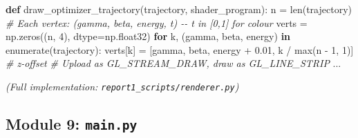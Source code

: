 \documentclass[
  11pt,
]{report}
\newenvironment{Shaded}{}{}
\newcommand{\BuiltInTok}[1]{\textcolor[rgb]{0.00,0.50,0.00}{#1}}
\newcommand{\CommentTok}[1]{\textcolor[rgb]{0.38,0.63,0.69}{\textit{#1}}}
\newcommand{\ControlFlowTok}[1]{\textcolor[rgb]{0.00,0.44,0.13}{\textbf{#1}}}
\newcommand{\DecValTok}[1]{\textcolor[rgb]{0.25,0.63,0.44}{#1}}
\newcommand{\FloatTok}[1]{\textcolor[rgb]{0.25,0.63,0.44}{#1}}
\newcommand{\KeywordTok}[1]{\textcolor[rgb]{0.00,0.44,0.13}{\textbf{#1}}}
\newcommand{\NormalTok}[1]{#1}
\newcommand{\OperatorTok}[1]{\textcolor[rgb]{0.40,0.40,0.40}{#1}}
\begin{document}
\begin{Shaded}
\begin{Highlighting}[]
\KeywordTok{def}\NormalTok{ draw\_optimizer\_trajectory(trajectory, shader\_program):}
\NormalTok{    n }\OperatorTok{=} \BuiltInTok{len}\NormalTok{(trajectory)}
    \CommentTok{\# Each vertex: (gamma, beta, energy, t) {-}{-} t in [0,1] for colour}
\NormalTok{    verts }\OperatorTok{=}\NormalTok{ np.zeros((n, }\DecValTok{4}\NormalTok{), dtype}\OperatorTok{=}\NormalTok{np.float32)}
    \ControlFlowTok{for}\NormalTok{ k, (gamma, beta, energy) }\KeywordTok{in} \BuiltInTok{enumerate}\NormalTok{(trajectory):}
\NormalTok{        verts[k] }\OperatorTok{=}\NormalTok{ [gamma, beta, energy }\OperatorTok{+} \FloatTok{0.01}\NormalTok{, k }\OperatorTok{/} \BuiltInTok{max}\NormalTok{(n }\OperatorTok{{-}} \DecValTok{1}\NormalTok{, }\DecValTok{1}\NormalTok{)]  }\CommentTok{\# z{-}offset}
    \CommentTok{\# Upload as GL\_STREAM\_DRAW, draw as GL\_LINE\_STRIP}
\NormalTok{    ...}
\end{Highlighting}
\end{Shaded}

\emph{(Full implementation: \texttt{report1\_scripts/renderer.py})}

\subsection{\texorpdfstring{Module 9:
\texttt{main.py}}{Module 9: main.py}}\label{module-9-main.py}
\end{document}
